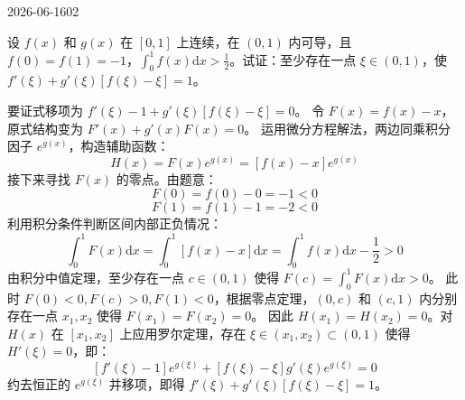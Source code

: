 \begin{mistake}{2026-06-16}{02}

\begin{problemcontent}
设 \(f(x)\) 和 \(g(x)\) 在 \([0,1]\) 上连续，在 \((0,1)\) 内可导，且 \(f(0)=f(1)=-1\)，\(\int_0^1 f(x)\mathrm{d}x > \frac{1}{2}\)。试证：至少存在一点 \(\xi \in (0,1)\)，使 \(f'(\xi) + g'(\xi)[f(\xi) - \xi] = 1\)。
\end{problemcontent}

\begin{solutioncontent}
要证式移项为 \(f'(\xi) - 1 + g'(\xi)[f(\xi) - \xi] = 0\)。
令 \(F(x) = f(x) - x\)，原式结构变为 \(F'(x) + g'(x)F(x) = 0\)。
运用微分方程解法，两边同乘积分因子 \(e^{g(x)}\)，构造辅助函数：
\[ H(x) = F(x)e^{g(x)} = [f(x) - x]e^{g(x)} \]
接下来寻找 \(F(x)\) 的零点。由题意：
\[ F(0) = f(0) - 0 = -1 < 0 \]
\[ F(1) = f(1) - 1 = -2 < 0 \]
利用积分条件判断区间内部正负情况：
\[ \int_0^1 F(x) \mathrm{d}x = \int_0^1 [f(x) - x] \mathrm{d}x = \int_0^1 f(x) \mathrm{d}x - \frac{1}{2} > 0 \]
由积分中值定理，至少存在一点 \(c \in (0,1)\) 使得 \(F(c) = \int_0^1 F(x) \mathrm{d}x > 0\)。
此时 \(F(0)<0, F(c)>0, F(1)<0\)，根据零点定理，\((0,c)\) 和 \((c,1)\) 内分别存在一点 \(x_1, x_2\) 使得 \(F(x_1) = F(x_2) = 0\)。
因此 \(H(x_1) = H(x_2) = 0\)。对 \(H(x)\) 在 \([x_1, x_2]\) 上应用罗尔定理，存在 \(\xi \in (x_1, x_2) \subset (0,1)\) 使得 \(H'(\xi) = 0\)，即：
\[ [f'(\xi) - 1]e^{g(\xi)} + [f(\xi) - \xi]g'(\xi)e^{g(\xi)} = 0 \]
约去恒正的 \(e^{g(\xi)}\) 并移项，即得 \(f'(\xi) + g'(\xi)[f(\xi) - \xi] = 1\)。
\end{solutioncontent}


\end{mistake}
